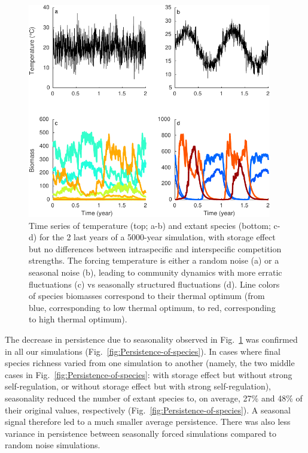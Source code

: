 \documentclass[a4paper,12pt]{article}
\begin{document}
\begin{figure}[!ht]
\begin{centering}
\includegraphics[width=0.95\textwidth]{Fig1-eps-converted-to.pdf}
\par\end{centering}
\caption{Time series of temperature (top; a-b) and extant species (bottom;
c-d) for the 2 last years of a 5000-year simulation, with storage
effect but no differences between intraspecific and interspecific
competition strengths. The forcing temperature is either a random
noise (a) or a seasonal noise (b), leading to community dynamics with
more erratic fluctuations (c) vs seasonally structured fluctuations
(d). Line colors of species biomasses correspond to their thermal
optimum (from blue, corresponding to low thermal optimum, to red,
corresponding to high thermal optimum).\label{fig:Times-series_temperature_species}}
\end{figure}

The decrease in persistence due to seasonality observed in Fig.~\ref{fig:Times-series_temperature_species}
was confirmed in all our simulations (Fig.~\ref{fig:Persistence-of-species}).
In cases where final species richness varied from one simulation to
another (namely, the two middle cases in Fig.~\ref{fig:Persistence-of-species}:
with storage effect but without strong self-regulation, or without
storage effect but with strong self-regulation), seasonality reduced
the number of extant species to, on average, 27\% and 48\% of their
original values, respectively (Fig.~\ref{fig:Persistence-of-species}).
A seasonal signal therefore led to a much smaller average persistence.
There was also less variance in persistence between seasonally forced
simulations compared to random noise simulations.
\end{document}
